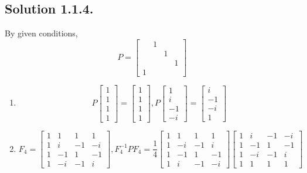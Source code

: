 \documentclass{article}
\begin{document}
\subsection*{Solution 1.1.4.}
By given conditions, 
\[P=\left[\begin{array}{rrrr}
 & 1 \\
 &&1 \\
 &&&1\\
 1
\end{array}\right]\]
\begin{enumerate}
    \item 
\[P\left[\begin{array}{r}1\\1\\1\\1\end{array}\right]
=\left[\begin{array}{r}1\\1\\1\\1\end{array}\right], 
P\left[\begin{array}{r}1\\i\\-1\\-i\end{array}\right]
=\left[\begin{array}{r}i\\-1\\-i\\1
\end{array}\right]\]
    \item
    \[F_4=\left[\begin{array}{rrrr}
 1 & 1 & 1 & 1 \\
 1 & i &-1 &-i \\
 1 &-1 & 1 &-1 \\
 1 &-i &-1 & i
\end{array}\right],F_4^{-1}PF_4=\frac{1}{4}\left[\begin{array}{rrrr}
 1 & 1 & 1 & 1 \\
 1 &-i &-1 & i \\
 1 &-1 & 1 &-1 \\
 1 & i &-1 &-i
\end{array}\right]
\left[\begin{array}{rrrr}
 1 & i &-1 &-i \\
 1 &-1 & 1 &-1 \\
 1 &-i &-1 & i \\
 1 & 1 & 1 & 1
\end{array}\right]
\]
\end{enumerate}
\end{document}

